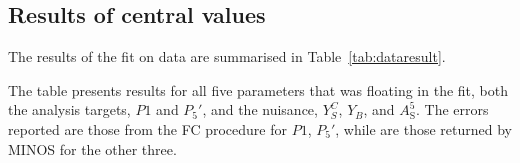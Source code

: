 \subsection{Results of central values}
\label{sec:res-centval}

The results of the fit on data are summarised in Table~\ref{tab:dataresult}.

The table presents results for all five parameters that was floating in the fit, both the analysis targets, $P1$ and $P_5'$, and the nuisance, $Y^{C}_{S}$, $Y_{B}$, and $A^5_\mathrm{S}$.
The errors reported are those from the FC procedure for $P1$, $P_5'$, while are those returned by MINOS for the other three.


